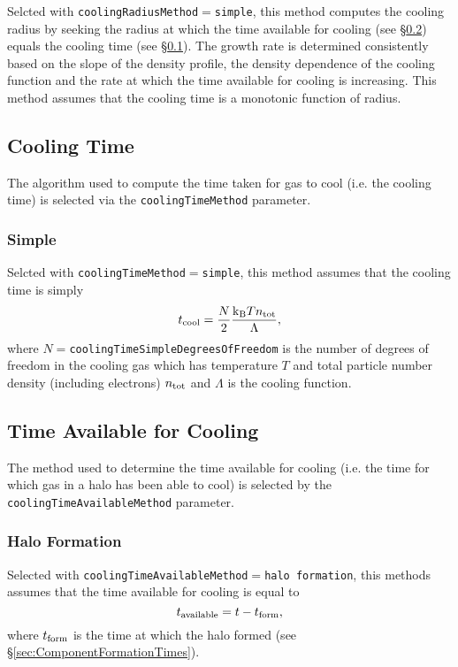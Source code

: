 Selcted with {\tt coolingRadiusMethod}$=${\tt simple}, this method computes the cooling radius by seeking the radius at which the time available for cooling (see \S\ref{sec:TimeAvailableCooling}) equals the cooling time (see \S\ref{sec:CoolingTime}). The growth rate is determined consistently based on the slope of the density profile, the density dependence of the cooling function and the rate at which the time available for cooling is increasing. This method assumes that the cooling time is a monotonic function of radius.

\subsection{Cooling Time}\label{sec:CoolingTime}

The algorithm used to compute the time taken for gas to cool (i.e. the cooling time) is selected via the {\tt coolingTimeMethod} parameter.

\subsubsection{Simple}

Selcted with {\tt coolingTimeMethod}$=${\tt simple}, this method assumes that the cooling time is simply
\begin{equation}
 t_{\rm cool} = {N \over 2} {{\rm k}_{\rm B} T n_{\rm tot} \over \Lambda},
\end{equation}
where $N=${\tt coolingTimeSimpleDegreesOfFreedom} is the number of degrees of freedom in the cooling gas which has temperature $T$ and total particle number density (including electrons) $n_{\rm tot}$ and $\Lambda$ is the cooling function.

\subsection{Time Available for Cooling}\label{sec:TimeAvailableCooling}

The method used to determine the time available for cooling (i.e. the time for which gas in a halo has been able to cool) is selected by the {\tt coolingTimeAvailableMethod} parameter.

\subsubsection{Halo Formation}

Selected with {\tt coolingTimeAvailableMethod}$=${\tt halo formation}, this methods assumes that the time available for cooling is equal to
\begin{equation}
 t_{\rm available} = t - t_{\rm form},
\end{equation}
where $t_{\rm form}$ is the time at which the halo formed (see \S\ref{sec:ComponentFormationTimes}).

